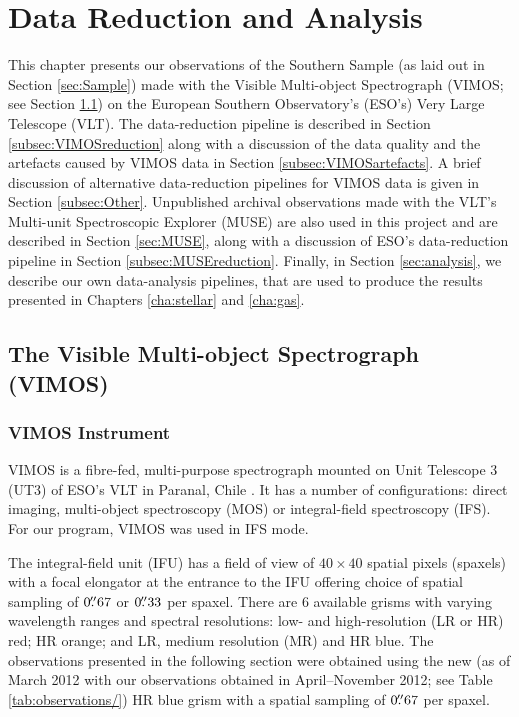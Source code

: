 \chapter{Data Reduction and Analysis}
	\label{cha:Data}
This chapter presents our observations of the Southern Sample (as laid out in Section \ref{sec:Sample}) made with the Visible Multi-object Spectrograph (VIMOS; see Section \ref{sec:VIMOS}) on the European Southern Observatory's (ESO's) Very Large Telescope (VLT). The data-reduction pipeline is described in Section \ref{subsec:VIMOSreduction} along with a discussion of the data quality and the artefacts caused by VIMOS data in Section \ref{subsec:VIMOSartefacts}. A brief discussion of alternative data-reduction pipelines for VIMOS data is given in Section \ref{subsec:Other}. Unpublished archival observations made with the VLT's Multi-unit Spectroscopic Explorer (MUSE) are also used in this project and are described in Section \ref{sec:MUSE}, along with a discussion of ESO's data-reduction pipeline in Section \ref{subsec:MUSEreduction}. Finally, in Section \ref{sec:analysis}, we describe our own data-analysis pipelines, that are used to produce the results presented in Chapters \ref{cha:stellar} and \ref{cha:gas}.  

\section{The Visible Multi-object Spectrograph (VIMOS)}
	\label{sec:VIMOS}
	\subsection{VIMOS Instrument}
		VIMOS is a fibre-fed, multi-purpose spectrograph mounted on Unit Telescope 3 (UT3) of ESO's VLT in Paranal, Chile \citep{LeFevre2003}. It has a number of configurations: direct imaging, multi-object spectroscopy (MOS) or integral-field spectroscopy (IFS). For our program, VIMOS was used in IFS mode. 

		The integral-field unit (IFU) has a field of view of $40 \times 40$ spatial pixels (spaxels) with a focal elongator at the entrance to the IFU offering choice of spatial sampling of $0 \hbox{$.\!\!^{\prime\prime}$}67$ or $0 \hbox{$.\!\!^{\prime\prime}$}33$ per spaxel. There are 6 available grisms with varying wavelength ranges and spectral resolutions: low- and high-resolution (LR or HR) red; HR orange; and LR, medium resolution (MR) and HR blue. The observations presented in the following section were obtained using the new (as of March 2012 with our observations obtained in April--November 2012; see Table \ref{tab:observations/}) HR blue grism with a spatial sampling of $0 \hbox{$.\!\!^{\prime\prime}$}67$ per spaxel. 

